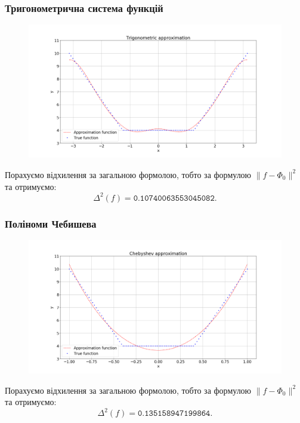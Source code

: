 \subsubsection{Тригонометрична система функцій}
\begin{figure}[H]
    \centering
    \includegraphics[width=\textwidth]{3.png}
\end{figure}

Порахуємо відхилення за загальною формолою, тобто за формулою $\|f - \Phi_0\|^2$ та отримуємо: \[ \Delta^2(f) = \texttt{0.10740063553045082}. \]

\subsubsection{Поліноми Чебишева}
\begin{figure}[H]
    \centering
    \includegraphics[width=\textwidth]{4.png}
\end{figure}

Порахуємо відхилення за загальною формолою, тобто за формулою $\|f - \Phi_0\|^2$ та отримуємо: \[ \Delta^2(f) = \texttt{0.135158947199864}. \]

\newpage

